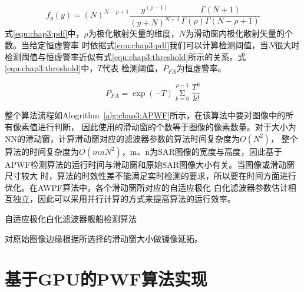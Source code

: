\begin{equation}
  \label{equ:chap3:pdf}
  {f_y}(y) = {(N)^{N - \rho  + 1}}\frac{{{y^{(\rho  - 1)}}}}{{{{(y + N)}^{N + 1}}}}\frac{{\Gamma (N + 1)}}{{\Gamma (\rho )\Gamma (N - \rho  + 1)}}
\end{equation}
式\ref{equ:chap3:pdf}中，$\rho$为极化散射矢量的维度，$N$为滑动窗内极化散射矢量的个数。当给定恒虚警率
时依据式\ref{equ:chap3:pdf}我们可以计算检测阈值，当$N$很大时检测阈值与恒虚警率近似有式\ref{equ:chap3:threshold}所示的关系。式\ref{equ:chap3:threshold}中，$T$代表
检测阈值，$P_{FA}$为恒虚警率。

\begin{equation}
  \label{equ:chap3:threshold}
  {P_{FA}} = \exp ( - T)\mathop \Sigma \limits_{k = 0}^{\rho  - 1} \frac{{{T^k}}}{{k!}}
\end{equation}

整个算法流程如Alogrithm~\ref{alg:chap3:APWF}所示，在该算法中要对图像中的所有像素值进行判断，
因此使用的滑动窗的个数等于图像的像素数量。对于大小为N\times N的滑动窗，计算滑动窗对应的滤波器参数的算法时间复杂度为$O(N^2)$，
整个算法的时间复杂度为$O(mnN^2)$，m、n为SAR图像的宽度与高度，因此基于APWF检测算法的运行时间与滑动窗和原始SAR图像大小有关。当图像或滑动窗尺寸较大
时，算法的时效性差不能满足实时检测的要求，所以要在时间方面进行优化。在AWPF算法中，各个滑动窗所对应的自适应极化
白化滤波器参数估计相互独立，因此可以采用并行计算的方式来提高算法的运行效率。

\begin{algorithm}[t]
  \caption{自适应极化白化滤波器舰船检测算法}
  \label{alg:chap3:APWF}
  \BlankLine
  
  对原始图像边缘根据所选择的滑动窗大小做镜像延拓。

 \end{algorithm}

\section{基于GPU的PWF算法实现}

